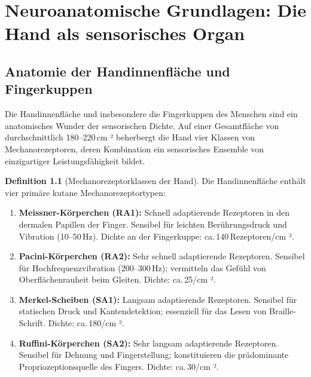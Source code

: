 ﻿\documentclass[12pt,a4paper]{report}
\theoremstyle{plain}
\theoremstyle{definition}
\newtheorem{definition}[theorem]{Definition}
\theoremstyle{remark}
\begin{document}
\chapter{Neuroanatomische Grundlagen: Die Hand als sensorisches Organ}
\label{chap:neuroanatomie}

\section{Anatomie der Handinnenfläche und Fingerkuppen}

Die Handinnenfläche und insbesondere die Fingerkuppen des Menschen sind
ein anatomisches Wunder der sensorischen Dichte. Auf einer Gesamtfläche
von durchschnittlich 180--220\,cm ² beherbergt die Hand vier Klassen von
Mechanorezeptoren, deren Kombination ein sensorisches Ensemble von
einzigartiger Leistungsfähigkeit bildet.

\begin{definition}[Mechanorezeptorklassen der Hand]
Die Handinnenfläche enthält vier primäre kutane Mechanorezeptortypen:
\begin{enumerate}
\item \textbf{Meissner-Körperchen (RA1):} Schnell adaptierende Rezeptoren
  in den dermalen Papillen der Finger. Sensibel für leichten Berührungsdruck
  und Vibration (10--50\,Hz). Dichte an der Fingerkuppe: ca.\,140\,Rezeptoren/cm ².
\item \textbf{Pacini-Körperchen (RA2):} Sehr schnell adaptierende Rezeptoren.
  Sensibel für Hochfrequenzvibration (200--300\,Hz); vermitteln das Gefühl
  von Oberflächenrauheit beim Gleiten. Dichte: ca.\,25/cm ².
\item \textbf{Merkel-Scheiben (SA1):} Langsam adaptierende Rezeptoren.
  Sensibel für statischen Druck und Kantendetektion; essenziell für
  das Lesen von Braille-Schrift. Dichte: ca.\,180/cm ².
\item \textbf{Ruffini-Körperchen (SA2):} Sehr langsam adaptierende Rezeptoren.
  Sensibel für Dehnung und Fingerstellung; konstituieren die prädominante
  Propriozeptionsquelle des Fingers. Dichte: ca.\,30/cm ².
\end{enumerate}
\end{definition}
\end{document}
